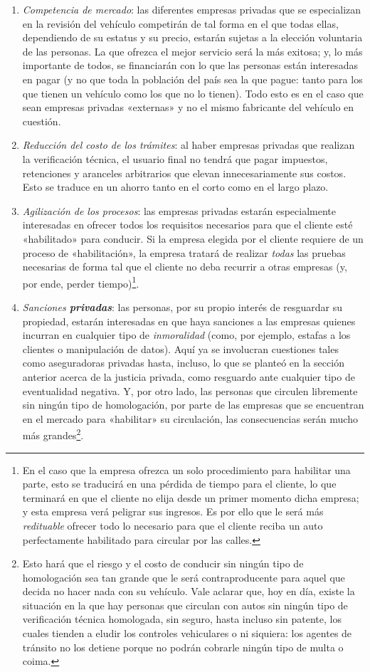 \documentclass[12pt,a4paper,twoside]{book}
\begin{document}
\begin{enumerate}
\item \textit{Competencia de mercado}: las diferentes empresas privadas que se especializan en la revisión del vehículo competirán de tal forma en el que todas ellas, dependiendo de su estatus y su precio, estarán sujetas a la elección voluntaria de las personas. La que ofrezca el mejor servicio será la más exitosa; y, lo más importante de todos, se financiarán con lo que las personas están interesadas en pagar (y no que toda la población del país sea la que pague: tanto para los que tienen un vehículo como los que no lo tienen). Todo esto es en el caso que sean empresas privadas «externas» y no el mismo fabricante del vehículo en cuestión.
\item \textit{Reducción del costo de los trámites}: al haber empresas privadas que realizan la verificación técnica, el usuario final no tendrá que pagar impuestos, retenciones y aranceles arbitrarios que elevan innecesariamente sus costos. Esto se traduce en un ahorro tanto en el corto como en el largo plazo.
\item \textit{Agilización de los procesos}: las empresas privadas estarán especialmente interesadas en ofrecer todos los requisitos necesarios para que el cliente esté «habilitado» para conducir. Si la empresa elegida por el cliente requiere de un proceso de «habilitación», la empresa tratará de realizar \textit{todas} las pruebas necesarias de forma tal que el cliente no deba recurrir a otras empresas (y, por ende, perder tiempo)\footnote{En el caso que la empresa ofrezca un solo procedimiento para habilitar una parte, esto se traducirá en una pérdida de tiempo para el cliente, lo que terminará en que el cliente no elija desde un primer momento dicha empresa; y esta empresa verá peligrar sus ingresos. Es por ello que le será más \textit{redituable} ofrecer todo lo necesario para que el cliente reciba un auto perfectamente habilitado para circular por las calles.}. 
\item \textit{Sanciones \textbf{privadas}}: las personas, por su propio interés de resguardar su propiedad, estarán interesadas en que haya sanciones a las empresas quienes incurran en cualquier tipo de \textit{inmoralidad} (como, por ejemplo, estafas a los clientes o manipulación de datos). Aquí ya se involucran cuestiones tales como aseguradoras privadas hasta, incluso, lo que se planteó en la sección anterior acerca de la justicia privada, como resguardo ante cualquier tipo de eventualidad negativa. Y, por otro lado, las personas que circulen libremente sin ningún tipo de homologación, por parte de las empresas que se encuentran en el mercado para «habilitar» su circulación, las consecuencias serán mucho más grandes\footnote{Esto hará que el riesgo y el costo de conducir sin ningún tipo de homologación sea tan grande que le será contraproducente para aquel que decida no hacer nada con su vehículo. Vale aclarar que, hoy en día, existe la situación en la que hay personas que circulan con autos sin ningún tipo de verificación técnica homologada, sin seguro, hasta incluso sin patente, los cuales tienden a eludir los controles vehiculares o ni siquiera: los agentes de tránsito no los detiene porque no podrán cobrarle ningún tipo de multa o coima.}.

\end{enumerate}
\end{document}
